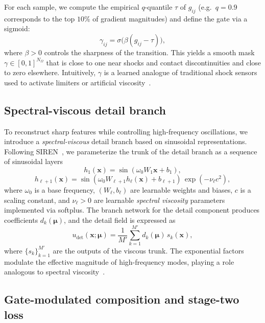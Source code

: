 \documentclass[a4paper,fleqn]{cas-dc}
\begin{document}
For each sample, we compute the empirical $q$-quantile $\tau$ of $g_{ij}$ (e.g.\ $q=0.9$ corresponds to the top $10\%$ of gradient magnitudes) and define the gate via a sigmoid:
\begin{equation}
  \gamma_{ij}
  = \sigma\big( \beta(g_{ij} - \tau) \big),
  \label{eq:gate_def}
\end{equation}
where $\beta>0$ controls the sharpness of the transition.
This yields a smooth mask $\gamma \in [0,1]^{N_\Omega}$ that is close to one near shocks and contact discontinuities and close to zero elsewhere.
Intuitively, $\gamma$ is a learned analogue of traditional shock sensors used to activate limiters or artificial viscosity~\citep{ShuOsher1988ENO,Tadmor1989SpectralViscosity}.

\subsection{Spectral-viscous detail branch}

To reconstruct sharp features while controlling high-frequency oscillations, we introduce a \emph{spectral-viscous} detail branch based on sinusoidal representations.
Following SIREN~\citep{Sitzmann2020SIREN}, we parameterize the trunk of the detail branch as a sequence of sinusoidal layers
\begin{equation}
  h_1(\mathbf{x}) = \sin\left( \omega_0 W_1 \mathbf{x} + b_1 \right),
\end{equation}
\begin{equation}
  h_{\ell+1}(\mathbf{x}) =
    \sin\left( \omega_0 W_{\ell+1} h_\ell(\mathbf{x}) + b_{\ell+1}\right)\, 
    \exp(-\nu_\ell c^2),
\end{equation}
where $\omega_0$ is a base frequency, $(W_\ell,b_\ell)$ are learnable weights and biases, $c$ is a scaling constant, and $\nu_\ell>0$ are learnable \emph{spectral viscosity} parameters implemented via softplus.
The branch network for the detail component produces coefficients $d_k(\boldsymbol{\mu})$, and the detail field is expressed as
\begin{equation}
  u_{\mathrm{det}}(\mathbf{x};\boldsymbol{\mu})
  = \frac{1}{M'} \sum_{k=1}^{M'} d_k(\boldsymbol{\mu})\, s_k(\mathbf{x}),
\end{equation}
where $\{s_k\}_{k=1}^{M'}$ are the outputs of the viscous trunk.
The exponential factors modulate the effective magnitude of high-frequency modes, playing a role analogous to spectral viscosity~\citep{Tadmor1989SpectralViscosity}.

\subsection{Gate-modulated composition and stage-two loss}
\end{document}
